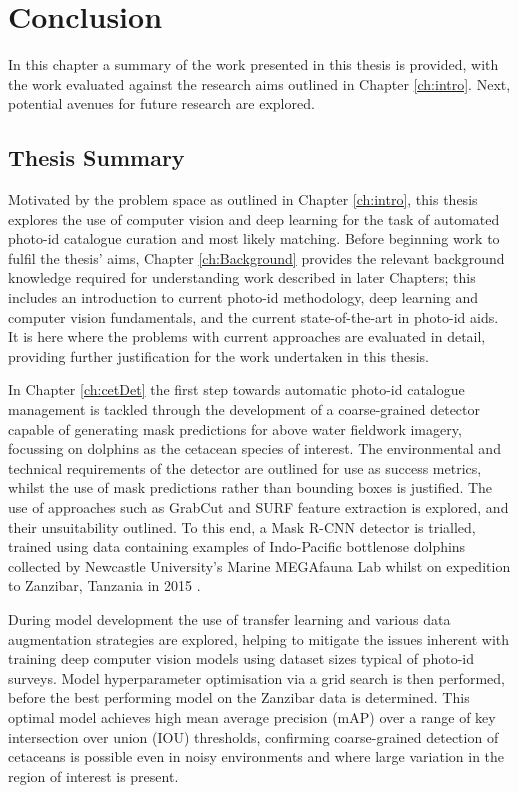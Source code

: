 \chapter{Conclusion}\label{ch:Conclusion}

In this chapter a summary of the work presented in this thesis is provided, with the work evaluated against the research aims outlined in Chapter \ref{ch:intro}. Next, potential avenues for future research are explored. 

\section{Thesis Summary}\label{ch:Conclusion,sec:Summary}

Motivated by the problem space as outlined in Chapter \ref{ch:intro}, this thesis explores the use of computer vision and deep learning for the task of automated photo-id catalogue curation and most likely matching. Before beginning work to fulfil the thesis' aims, Chapter \ref{ch:Background} provides the relevant background knowledge required for understanding work described in later Chapters; this includes an introduction to current photo-id methodology, deep learning and computer vision fundamentals, and the current state-of-the-art in photo-id aids. It is here where the problems with current approaches are evaluated in detail, providing further justification for the work undertaken in this thesis. 

In Chapter \ref{ch:cetDet} the first step towards automatic photo-id catalogue management is tackled through the development of a coarse-grained detector capable of generating mask predictions for above water fieldwork imagery, focussing on dolphins as the cetacean species of interest. The environmental and technical requirements of the detector are outlined for use as success metrics, whilst the use of mask predictions rather than bounding boxes is justified. The use of approaches such as GrabCut \cite{rother_grabcut_2004} and SURF feature extraction \cite{bay_speeded-up_2008} is explored, and their unsuitability outlined. To this end, a Mask R-CNN \cite{he_mask_2017} detector is trialled, trained using data  containing examples of Indo-Pacific bottlenose dolphins collected by Newcastle University's Marine MEGAfauna Lab whilst on expedition to Zanzibar, Tanzania in 2015 \cite{sharpe_indian_2019}. 

During model development the use of transfer learning and various data augmentation strategies are explored, helping to mitigate the issues inherent with training deep computer vision models using dataset sizes typical of photo-id surveys. Model hyperparameter optimisation via a grid search is then performed, before the best performing model on the Zanzibar data is determined. This optimal model achieves high mean average precision (mAP) over a range of key intersection over union (IOU) thresholds, confirming coarse-grained detection of cetaceans is possible even in noisy environments and where large variation in the region of interest is present. 


